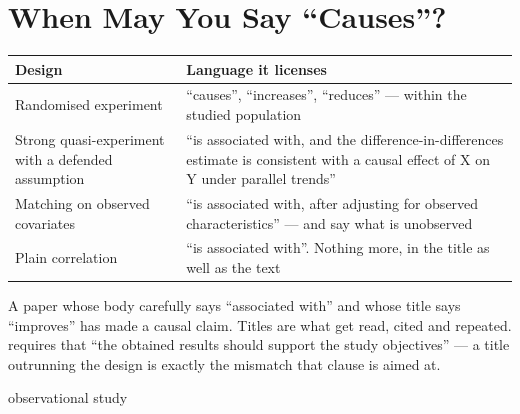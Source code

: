 \section{When May You Say ``Causes''?}

\begin{center}
\small
\begin{tabular}{@{}L{4.0cm}L{10.3cm}@{}}
\toprule
\textbf{Design} & \textbf{Language it licenses} \\
\midrule
Randomised experiment
  & ``causes'', ``increases'', ``reduces'' --- within the studied population \\
Strong quasi-experiment with a defended assumption
  & ``is associated with, and the difference-in-differences estimate is
    consistent with a causal effect of X on Y under parallel trends'' \\
Matching on observed covariates
  & ``is associated with, after adjusting for observed characteristics'' ---
    and say what is unobserved \\
Plain correlation
  & ``is associated with''. Nothing more, in the title as well as the text \\
\bottomrule
\end{tabular}
\end{center}

\begin{conceptbox}
A paper whose body carefully says ``associated with'' and whose title says
``improves'' has made a causal claim. Titles are what get read, cited and
repeated.  requires that ``the obtained results
should support the study objectives'' --- a title outrunning the design is
exactly the mismatch that clause is aimed at.
\end{conceptbox}

\begin{traditions}{observational study}
\end{traditions}

